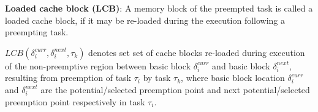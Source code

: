 \begin{definition}
\textbf{Loaded cache block (LCB)}: A memory block of the preempted task is called a loaded cache block, if it may be re-loaded during the execution following a preempting task.
\end{definition}
\noindent
\begin{math}\textit{LCB}(\delta_{i}^{curr},\delta_{i}^{next},\tau_{k})\end{math} denotes set set of cache blocks re-loaded during execution of the non-preemptive region between basic block \begin{math}\delta_{i}^{curr}\end{math} and basic block \begin{math}\delta_{i}^{next}\end{math}, resulting from preemption of task \begin{math}\tau_{i}\end{math} by task \begin{math}\tau_{k}\end{math}, where basic block location \begin{math}\delta_{i}^{curr}\end{math} and \begin{math}\delta_{i}^{next}\end{math} are the potential/selected preemption point and next potential/selected preemption point respectively in task \begin{math}\tau_{i}\end{math}.

